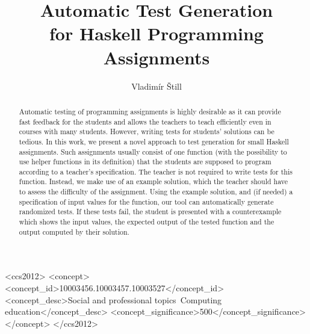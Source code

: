 \documentclass[sigconf]{acmart} %
\begin{document}
\fancyhead{}

\title{Automatic Test Generation\\ for Haskell Programming Assignments}

\author{Vladimír Štill}

\begin{abstract}
    Automatic testing of programming assignments is highly desirable as it can
    provide fast feedback for the students and allows the teachers to teach
    efficiently even in courses with many students.
    However, writing tests for students' solutions can be tedious.
    In this work, we present a novel approach to test generation for small Haskell
    assignments.
    Such assignments usually consist of one function (with the possibility to use
    helper functions in its definition) that the students are supposed to program
    according to a teacher's specification.
    The teacher is not required to write tests for this function.
    Instead, we make use of an example solution, which the teacher should have
    to assess the difficulty of the assignment.
    Using the example solution, and (if needed) a specification of input values for
    the function, our tool can automatically generate randomized tests.
    If these tests fail, the student is presented with a counterexample which
    shows the input values, the expected output of the tested function and the
    output computed by their solution.
\end{abstract}

\begin{CCSXML}
<ccs2012>
    <concept>
        <concept_id>10003456.10003457.10003527</concept_id>
        <concept_desc>Social and professional topics~Computing education</concept_desc>
        <concept_significance>500</concept_significance>
    </concept>
</ccs2012>
\end{CCSXML}
\end{document}
